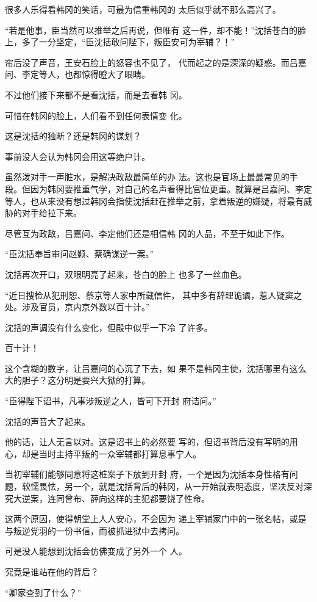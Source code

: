 很多人乐得看韩冈的笑话，可最为信重韩冈的 太后似乎就不那么高兴了。

“若是他事，臣当然可以推举之后再说，但唯有 这一件，却不能！”沈括苍白的脸上，多了一分坚定，“臣沈括敢问陛下，叛臣安可为宰辅？！”

帘后没了声音，王安石脸上的怒容也不见了， 代而起之的是深深的疑惑。而吕嘉问、李定等人，也都惊得瞪大了眼睛。

不过他们接下来都不是看沈括，而是去看韩 冈。

可惜在韩冈的脸上，人们看不到任何表情变 化。

这是沈括的独断？还是韩冈的谋划？

事前没人会认为韩冈会用这等绝户计。

虽然泼对手一声脏水，是解决政敌最简单的办 法。这也是官场上最最常见的手段。但因为韩冈要推重气学，对自己的名声看得比官位更重。就算是吕嘉问、李定等人，也从来没有想过韩冈会指使沈括赶在推举之前，拿着叛逆的嫌疑，将最有威胁的对手给拉下来。

尽管互为政敌，吕嘉问、李定他们还是相信韩 冈的人品，不至于如此下作。

“臣沈括奉旨审问赵颢、蔡确谋逆一案。”

沈括再次开口，双眼明亮了起来，苍白的脸上 也多了一丝血色。

“近日搜检从犯刑恕、蔡京等人家中所藏信件， 其中多有辞理诡谲，惹人疑窦之处。涉及官员，京内京外数以百十计。”

沈括的声调没有什么变化，但殿中似乎一下冷 了许多。

百十计！

这个含糊的数字，让吕嘉问的心沉了下去，如 果不是韩冈主使，沈括哪里有这么大的胆子？这分明是要兴大狱的打算。

“臣得陛下诏书，凡事涉叛逆之人，皆可下开封 府诘问。”

沈括的声音大了起来。

他的话，让人无言以对。这是诏书上的必然要 写的，但诏书背后没有写明的用心，却是当时主持平叛的一众宰辅都打算息事宁人。

当初宰辅们能够同意将这桩案子下放到开封 府，一个是因为沈括本身性格有问题，软懦畏怯，另一个，就是沈括背后的韩冈，从一开始就表明态度，坚决反对深究大逆案，连同曾布、薛向这样的主犯都要饶了性命。

这两个原因，使得朝堂上人人安心，不会因为 递上宰辅家门中的一张名帖，或是与叛逆党羽的一份书信，而被抓进狱中去拷问。

可是没人能想到沈括会仿佛变成了另外一个 人。

究竟是谁站在他的背后？

“卿家查到了什么？”

